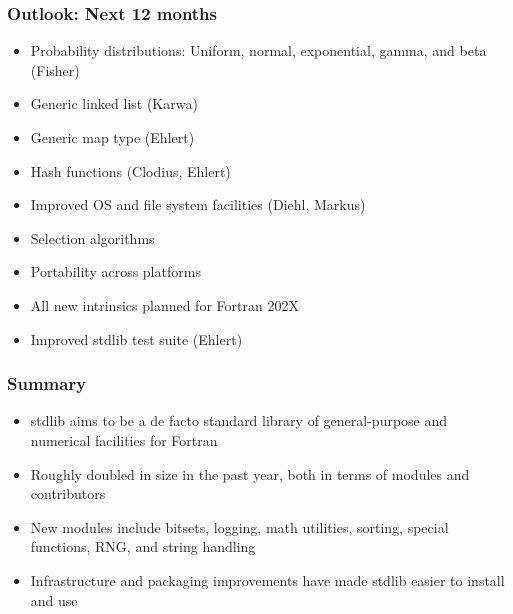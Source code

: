 \documentclass[aspectratio=169]{beamer}
\begin{document}
\begin{frame}
  \frametitle{Outlook: Next 12 months}

  \begin{itemize}
  \item Probability distributions: Uniform, normal, exponential, gamma, and beta (Fisher)
  \item Generic linked list (Karwa)
  \item Generic map type (Ehlert)
  \item Hash functions (Clodius, Ehlert)
  \item Improved OS and file system facilities (Diehl, Markus)
  \item Selection algorithms
  \item Portability across platforms
  \item All new intrinsics planned for Fortran 202X
  \item Improved stdlib test suite (Ehlert)
  \end{itemize}

\end{frame}


\begin{frame}
  \frametitle{Summary}

  \begin{itemize}
  \item stdlib aims to be a de facto standard library of general-purpose and numerical facilities for Fortran
  \item Roughly doubled in size in the past year, both in terms of modules and contributors
  \item New modules include bitsets, logging, math utilities, sorting, special functions, RNG, and string handling
  \item Infrastructure and packaging improvements have made stdlib easier to install and use
  \end{itemize}
\end{frame}
\end{document}
